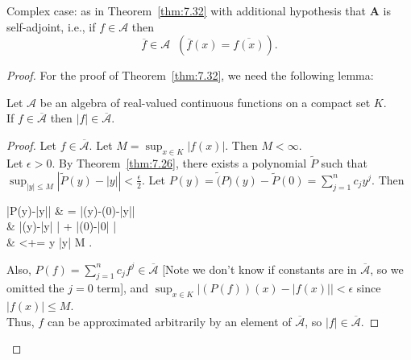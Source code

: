 \begin{thm}[33]
	Complex case: as in Theorem~\ref{thm:7.32} with additional hypothesis that $\mathbf{A}$ is self-adjoint, i.e., if $f \in \mathcal{A}$ then
	\[
		\overline{f}  \in \mathcal{A} \;\; (\overline{f}(x) = \overline{f(x)})
		.\]
	\begin{proof}
		For the proof of Theorem~\ref{thm:7.32}, we need the following lemma:
		\begin{lemma}[1]
			Let $\mathcal{A}$ be an algebra of real-valued continuous functions on a compact set $K$.\\
			If $f \in \overline{\mathcal{A}}$ then $\left|f\right| \in \overline{\mathcal{A}}$.
			\begin{proof}
				Let $f \in \overline{\mathcal{A}}$. Let $M=\sup_{x \in K} \left|f(x)\right| $. Then $M<\infty$.\\
				Let $\epsilon>0$. By Theorem~\ref{thm:7.26}, there exists a polynomial $\tilde{P}$ such that $\sup_{\left|y\right| \le M} \left|\tilde{P}(y)-\left|y\right| \right| <\frac{\epsilon}{2}$.
				Let $P(y)=\tilde(P)(y)-\tilde{P}(0)= \sum_{j=1}^{n}{c_jy^{j}}$.
				Then
				\begin{flalign*}
					\left|P(y)-\left|y\right|\right| & = \left|\tilde{P}(y)-(0)-\left|y\right|\right|                                                     \\
					                                 & \le \left|(y)-\left|y\right| \right| + \left|(0)-\left|0\right| \right|                   \\
					                                 & <\frac{\epsilon}{2}+=\epsilon {} y  \left|y\right|  \le M
					.\end{flalign*}
				Also, $P(f)=\sum_{j=1}^{n}{c_{j}f^{j}} \in \overline{\mathcal{A}}$ [Note we don't know if constants are in $\overline{\mathcal{A}}$, so we omitted the $j=0$ term], and $\sup_{x \in K}\left|(P(f))(x)-\left|f(x)\right| \right| <\epsilon$ since $\left|f(x)\right| \le M$.\\
				Thus, $f$ can be approximated arbitrarily by an element of $\overline{\mathcal{A}}$, so $\left|f\right| \in \overline{\mathcal{A}}$.
			\end{proof}
		\end{lemma}
	\end{proof}
\end{thm}


